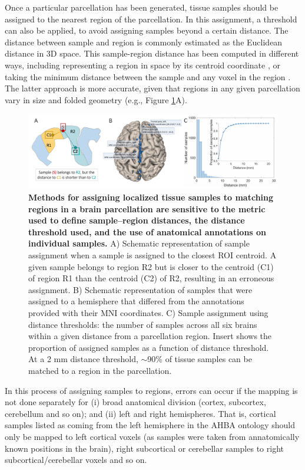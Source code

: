 Once a particular parcellation has been generated, tissue samples should be assigned to the nearest region of the parcellation. In this assignment, a threshold can also be applied, to avoid assigning samples beyond a certain distance. The distance between sample and region is commonly estimated as the Euclidean distance in 3D space. This sample-region distance has been computed in different ways, including representing a region in space by its centroid coordinate \citep{Vertes2016b,Whitaker2016a,McColgan2018}, or taking the minimum distance between the sample and any voxel in the region \citep{French2015,Parkes2017,Romme2017}. The latter approach is more accurate, given that regions in any given parcellation vary in size and folded geometry (e.g., Figure \ref{fig:Ch4Fig5}A).

\begin{figure}[h!]
  \centering
    \includegraphics[width=1\textwidth]{Chapter4/Ch4Fig5.pdf}
\caption{\textbf{Methods for assigning localized tissue samples to matching regions in a brain parcellation are sensitive to the metric used to define sample–region distances, the distance threshold used, and the use of anatomical annotations on individual samples.}
A) Schematic representation of sample assignment when a sample is assigned to the closest ROI centroid. A given sample belongs to region R2 but is closer to the centroid (C1) of region R1 than the centroid (C2) of R2, resulting in an erroneous assignment.
B) Schematic representation of samples that were assigned to a hemisphere that differed from the annotations provided with their MNI coordinates.
C) Sample assignment using distance thresholds: the number of samples across all six brains within a given distance from a parcellation region. Insert shows the proportion of assigned samples as a function of distance threshold. At a \num{2} mm distance threshold, $\sim$\num{90}\%  of tissue samples can be matched to a region in the parcellation. }
\label{fig:Ch4Fig5}
\end{figure}

In this process of assigning samples to regions, errors can occur if the mapping is not done separately for (i) broad anatomical division (cortex, subcortex, cerebellum and so on); and (ii) left and right hemispheres. That is, cortical samples listed as coming from the left hemisphere in the AHBA ontology should only be mapped to left cortical voxels (as samples were taken from annatomically known positions in the brain), right subcortical or cerebellar samples to right subcortical/cerebellar voxels and so on.

